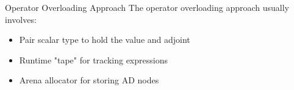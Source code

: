 \documentclass[dvipsnames, aspectratio=169]{beamer}
\begin{document}
\begin{frame}{Operator Overloading Approach}
The operator overloading approach usually involves:
\begin{itemize}
    \item Pair scalar type to hold the value and adjoint
    \item Runtime "tape" for tracking expressions
    \item Arena allocator for storing AD nodes
\end{itemize}
\end{frame}

\end{document}
